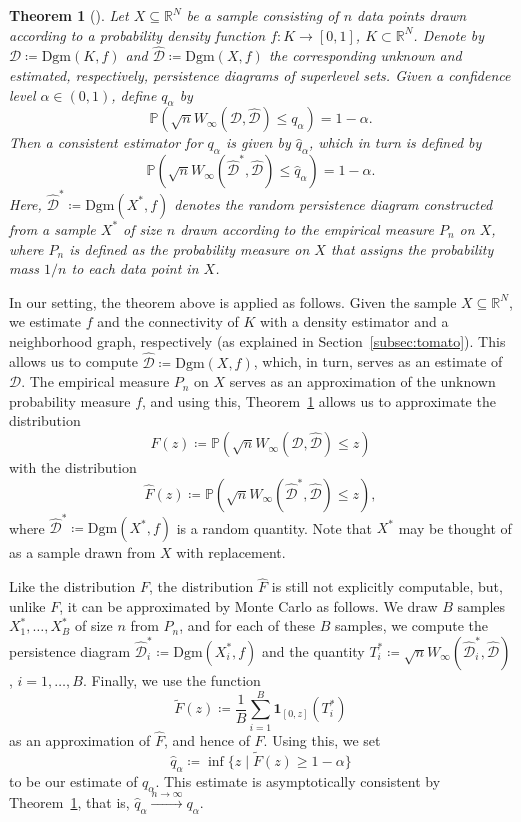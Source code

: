 \documentclass[10pt]{article} %
\theoremstyle{plain}
\newtheorem{theorem}{Theorem}[section]
\newcommand{\RR}{\mathbb{R}}
\newcommand{\PPP}{\mathbb{P}}
\newcommand{\DD}{\mathcal{D}}
\newcommand{\bneck}[2]{W_{\infty}(#1,#2)}
\newcommand{\dgm}{\mathrm{Dgm}}
\begin{document}
\begin{theorem}[\citet{chazal_bottleneck_bootstrap}]\label{thm:bottleneck_bootstrap}
    Let \(X\subseteq\RR^{N}\) be a sample consisting of \(n\) data points drawn according to a probability density function \(f\colon K\to[0,1]\), \(K\subset\RR^{N}\).
    Denote by \(\DD\coloneqq\dgm(K, f)\) and \(\widehat{\DD}\coloneqq\dgm(X, f)\) the corresponding unknown and estimated, respectively, persistence diagrams of superlevel sets.
    Given a confidence level \(\alpha\in(0,1)\), define \(q_{\alpha}\) by \[
        \PPP(\sqrt{n}\bneck{\DD}{\widehat{\DD}}\leq q_{\alpha})=1-\alpha.
    \]
    Then a consistent estimator for \(q_{\alpha}\) is given by \(\widehat{q}_{\alpha}\), which in turn is defined by\[
        \PPP(\sqrt{n}\bneck{\widehat{\DD}^{*}}{\widehat{\DD}}\leq \widehat{q}_{\alpha})=1-\alpha.
    \]
    Here, \(\widehat{\DD}^{*}\coloneqq\dgm(X^{*}, f)\) denotes the random persistence diagram constructed from a sample \(X^{*}\) of size \(n\) drawn according to the empirical measure \(P_{n}\) on \(X\), where \(P_{n}\) is defined as the probability measure on \(X\) that assigns the probability mass \(1/n\) to each data point in \(X\).
\end{theorem}

In our setting, the theorem above is applied as follows. Given the sample \(X\subseteq\RR^{N}\), we estimate \(f\) and the connectivity of \(K\) with a density estimator and a neighborhood graph, respectively (as explained in Section~\ref{subsec:tomato}).
This allows us to compute \(\widehat{\DD}\coloneqq\dgm(X, f)\), which, in turn, serves as an estimate of \(\DD\).
The empirical measure \(P_{n}\) on \(X\) serves as an approximation of the unknown probability measure \(f\), and using this, Theorem~\ref{thm:bottleneck_bootstrap} allows us to approximate the distribution \[
F(z)\coloneqq\PPP(\sqrt{n}\bneck{\DD}{\widehat{\DD}}\leq z)
\] with the distribution \[
\widehat{F}(z)\coloneqq\PPP(\sqrt{n}\bneck{\widehat{\DD}^{*}}{\widehat{\DD}}\leq z),
\] where \(\widehat{\DD}^{*}\coloneqq\dgm(X^{*}, f)\) is a random quantity.
Note that \(X^{*}\) may be thought of as a sample drawn from \(X\) with replacement.

Like the distribution \(F\), the distribution \(\widehat{F}\) is still not explicitly computable, but, unlike \(F\), it can be approximated by Monte Carlo as follows. We draw \(B\) samples \(X_{1}^{*},\dots,X_{B}^{*}\) of size \(n\) from \(P_{n}\), and for each of these \(B\) samples, we compute the persistence diagram \(\widehat{\DD}_{i}^{*}\coloneqq\dgm(X_{i}^{*}, f)\) and the quantity \(T_{i}^{*}\coloneqq\sqrt{n}\bneck{\widehat{\DD}_{i}^{*}}{\widehat{\DD}}\), \(i=1,\dots,B\).
Finally, we use the function \[
\widetilde{F}(z)\coloneqq\frac{1}{B}\sum_{i=1}^{B}\mathbf{1}_{[0, z]}(T_{i}^{*})
\] as an approximation of \(\widehat{F}\), and hence of \(F\).
Using this, we set \[
\widehat{q}_{\alpha}\coloneqq\inf\{z\mid \widetilde{F}(z)\geq 1-\alpha\}
\] to be our estimate of \(q_{\alpha}\).
This estimate is asymptotically consistent by Theorem~\ref{thm:bottleneck_bootstrap}, that is, \(\widehat{q}_{\alpha}\xrightarrow{n\to\infty}q_{\alpha}\).
\end{document}
